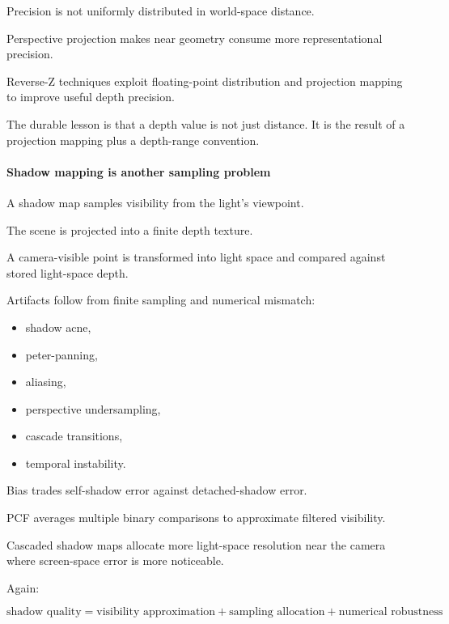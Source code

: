 Precision is not uniformly distributed in world-space distance.

Perspective projection makes near geometry consume more representational precision.

Reverse-Z techniques exploit floating-point distribution and projection mapping to improve useful depth precision.

The durable lesson is that a depth value is not just distance. It is the result of a projection mapping plus a depth-range convention.

\paragraph{Shadow mapping is another sampling problem}\label{03-visual-computing-i-ch001-shadow-mapping-is-another-sampling-problem}

\hypertarget{03-visual-computing-i-ch001-shadow-mapping-is-another-sampling-problem}{}

A shadow map samples visibility from the light's viewpoint.

The scene is projected into a finite depth texture.

A camera-visible point is transformed into light space and compared against stored light-space depth.

Artifacts follow from finite sampling and numerical mismatch:

\begin{itemize}
\tightlist
\item
  shadow acne,
\item
  peter-panning,
\item
  aliasing,
\item
  perspective undersampling,
\item
  cascade transitions,
\item
  temporal instability.
\end{itemize}

Bias trades self-shadow error against detached-shadow error.

PCF averages multiple binary comparisons to approximate filtered visibility.

Cascaded shadow maps allocate more light-space resolution near the camera where screen-space error is more noticeable.

Again:

\[
\boxed{
\text{shadow quality}
=
\text{visibility approximation}
+
\text{sampling allocation}
+
\text{numerical robustness}
}
\]

